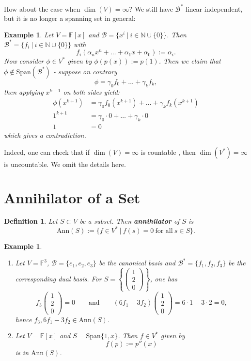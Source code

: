 \documentclass[12pt]{amsbook}
\newtheorem{definition}[theorem]{Definition}
\newtheorem{example}[theorem]{Example}
\begin{document}
How about the case when $\dim(V) = \infty$? We still have $\mathcal{B}^*$ linear independent, but it is no longer a spanning set in general:
\begin{example}
    Let $V = \mathbb{F}[x]$ and $\mathcal{B} = \{x^i\ |\ i \in \mathbb{N} \cup \{0\}\}$. Then $\mathcal{B}^* = \{f_i\ |\ i \in \mathbb{N} \cup \{0\}\}$ with
    $$f_i(\alpha_n x^n + \dots + \alpha_1 x + \alpha_0) := \alpha_i.$$
    Now consider $\phi \in V^*$ given by $\phi(p(x)) := p(1)$. Then we claim that $\phi \notin \mathrm{Span}(\mathcal{B}^*)$ - suppose on contrary
    $$\phi = \gamma_0 f_0 + \dots + \gamma_k f_k,$$
    then applying $x^{k+1}$ on both sides yield:
    \begin{align*}
    \phi(x^{k+1}) &= \gamma_0 f_0(x^{k+1}) + \dots + \gamma_k f_k(x^{k+1}) \\
    1^{k+1} &= \gamma_0 \cdot 0 + \dots + \gamma_k \cdot 0 \\
    1 &= 0
    \end{align*}
    which gives a contradiction.
\end{example}
Indeed, one can check that if $\dim(V) = \infty$ is countable , then $\dim(V^*) = \infty$ is uncountable. We omit the details here.

\section{Annihilator of a Set}
\begin{definition}
    Let $S \subset V$ be a subset. Then {\bf annihilator} of $S$ is 
    $$\mathrm{Ann}(S) := \{f \in V^*\ |\ f(s) = 0\ \text{for all}\ s \in S\}.$$
\end{definition}

\begin{example}\
    \begin{enumerate}
        \item Let $V=\mathbb{F}^{3}$, $\mathcal{B}=\{e_1,e_2,e_3\}$ be the canonical basis and $\mathcal{B}^{*}=\{f_1,f_2,f_3\}$ be the corresponding dual basis. 
        For $S=\left\{ \begin{pmatrix}1\\2\\0\end{pmatrix} \right\}$, one has
        $$f_3\begin{pmatrix}1\\2\\0\end{pmatrix}=0\quad\quad\text{and}
        \quad\quad(6f_1-3f_2)\begin{pmatrix}1\\2\\0\end{pmatrix}=6\cdot 1-3\cdot 2=0,$$
        hence $f_3,6f_1-3f_2\in\mathrm{Ann}(S)$.
        \item Let $V=\mathbb{F}[x]$ and $S=\mathrm{Span}\{1,x\}$. Then $f\in V^{*}$ given by
        $$f(p):=p''(x)$$
        is in $\mathrm{Ann}(S)$.
    \end{enumerate}
\end{example}
\end{document}
